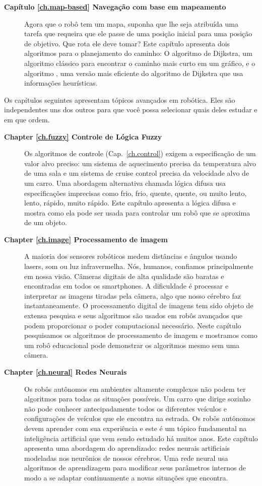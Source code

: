 \begin{description}
\item [\textbf{Capítulo \ref{ch.map-based} Navegação com base em mapeamento}] Agora que o robô tem um mapa, suponha que lhe seja atribuída uma tarefa que requeira que ele passe de uma posição inicial para uma posição de objetivo. Que rota ele deve tomar? Este capítulo apresenta dois algoritmos para o planejamento do caminho: O algoritmo de Dijkstra, um algoritmo clássico para encontrar o caminho mais curto em um gráfico, e o algoritmo \astar{}, uma versão mais eficiente do algoritmo de Dijkstra que usa informações heurísticas.
\end{description}

Os capítulos seguintes apresentam tópicos avançados em robótica. Eles são independentes uns dos outros para que você possa selecionar quais deles estudar e em que ordem.
\begin{description}
\item [\textbf{Chapter \ref{ch.fuzzy} Controle de Lógica Fuzzy}] Os algoritmos de controle (Cap.~\ref{ch.control}) exigem a especificação de um valor alvo preciso: um sistema de aquecimento precisa da temperatura alvo de uma sala e um sistema de cruise control precisa da velocidade alvo de um carro. Uma abordagem alternativa chamada lógica difusa usa especificações imprecisas como frio, frio, quente, quente, ou muito lento, lento, rápido, muito rápido. Este capítulo apresenta a lógica difusa e mostra como ela pode ser usada para controlar um robô que se aproxima de um objeto.

\item [\textbf{Chapter \ref{ch.image} Processamento de imagem}] A maioria dos sensores robóticos medem distâncias e ângulos usando lasers, som ou luz infravermelha. Nós, humanos, confiamos principalmente em nossa visão. Câmeras digitais de alta qualidade são baratas e encontradas em todos os smartphones. A dificuldade é processar e interpretar as imagens tiradas pela câmera, algo que nosso cérebro faz instantaneamente. O processamento digital de imagens tem sido objeto de extensa pesquisa e seus algoritmos são usados em robôs avançados que podem proporcionar o poder computacional necessário. Neste capítulo pesquisamos os algoritmos de processamento de imagem e mostramos como um robô educacional pode demonstrar os algoritmos mesmo sem uma câmera.

\item [\textbf{Chapter \ref{ch.neural} Redes Neurais}] Os robôs autônomos em ambientes altamente complexos não podem ter algoritmos para todas as situações possíveis. Um carro que dirige sozinho não pode conhecer antecipadamente todos os diferentes veículos e configurações de veículos que ele encontra na estrada. Os robôs autônomos devem aprender com sua experiência e este é um tópico fundamental na inteligência artificial que vem sendo estudado há muitos anos. Este capítulo apresenta uma abordagem do aprendizado: redes neurais artificiais modeladas nos neurônios de nossos cérebros. Uma rede neural usa algoritmos de aprendizagem para modificar seus parâmetros internos de modo a se adaptar continuamente a novas situações que encontra.


\end{description}
